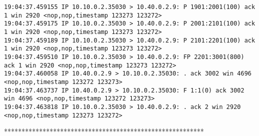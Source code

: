 \documentclass[a4paper,12pt]{article}
\begin{document}
\begin{lstlisting}
19:04:37.459155 IP 10.10.0.2.35030 > 10.40.0.2.9: P 1901:2001(100) ack 1 win 2920 <nop,nop,timestamp 123273 123272>
19:04:37.459175 IP 10.10.0.2.35030 > 10.40.0.2.9: P 2001:2101(100) ack 1 win 2920 <nop,nop,timestamp 123273 123272>
19:04:37.459189 IP 10.10.0.2.35030 > 10.40.0.2.9: P 2101:2201(100) ack 1 win 2920 <nop,nop,timestamp 123273 123272>
19:04:37.459510 IP 10.10.0.2.35030 > 10.40.0.2.9: FP 2201:3001(800) ack 1 win 2920 <nop,nop,timestamp 123273 123272>
19:04:37.460058 IP 10.40.0.2.9 > 10.10.0.2.35030: . ack 3002 win 4696 <nop,nop,timestamp 123272 123273>
19:04:37.463737 IP 10.40.0.2.9 > 10.10.0.2.35030: F 1:1(0) ack 3002 win 4696 <nop,nop,timestamp 123272 123273>
19:04:37.463818 IP 10.10.0.2.35030 > 10.40.0.2.9: . ack 2 win 2920 <nop,nop,timestamp 123273 123272>
\end{lstlisting}

*********************************************************
\end{document}
